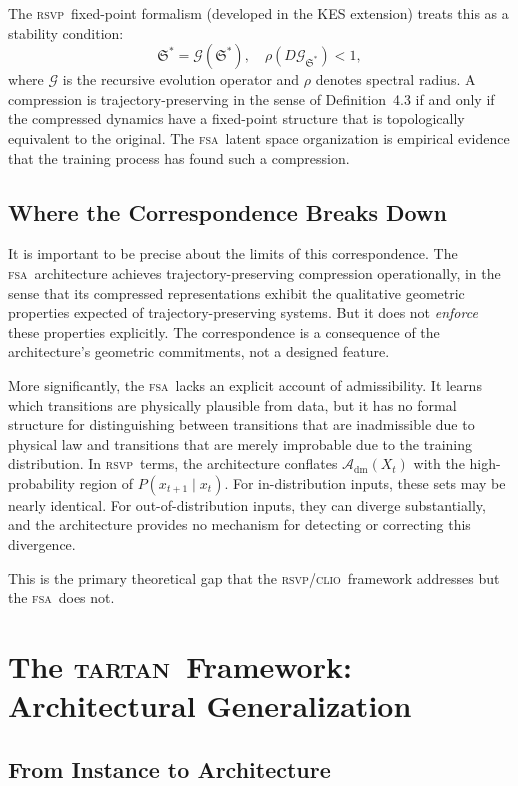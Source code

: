 \documentclass[11pt,a4paper]{article}
\theoremstyle{plain}
\theoremstyle{definition}
\theoremstyle{remark}
\newcommand{\Adm}{\mathcal{A}_{\mathrm{dm}}}
\newcommand{\KES}{\mathfrak{S}}
\newcommand{\RSVP}{\textup{\textsc{rsvp}}}
\newcommand{\CLIO}{\textup{\textsc{clio}}}
\newcommand{\TARTAN}{\textup{\textsc{tartan}}}
\newcommand{\FSA}{\textup{\textsc{fsa}}}
\begin{document}
The \RSVP\ fixed-point formalism (developed in the KES extension) treats
this as a stability condition:
\[
\KES^* = \mathcal{G}(\KES^*),
\quad \rho(D\mathcal{G}_{\KES^*}) < 1,
\]
where $\mathcal{G}$ is the recursive evolution operator and $\rho$ denotes
spectral radius. A compression is trajectory-preserving in the sense of
Definition~4.3 if and only if the compressed dynamics have a fixed-point
structure that is topologically equivalent to the original. The \FSA\
latent space organization is empirical evidence that the training process
has found such a compression.

\subsection{Where the Correspondence Breaks Down}

It is important to be precise about the limits of this correspondence.
The \FSA\ architecture achieves trajectory-preserving compression
operationally, in the sense that its compressed representations exhibit
the qualitative geometric properties expected of trajectory-preserving
systems. But it does not \textit{enforce} these properties explicitly. The
correspondence is a consequence of the architecture's geometric
commitments, not a designed feature.

More significantly, the \FSA\ lacks an explicit account of admissibility.
It learns which transitions are physically plausible from data, but it has
no formal structure for distinguishing between transitions that are
inadmissible due to physical law and transitions that are merely improbable
due to the training distribution. In \RSVP\ terms, the architecture
conflates $\Adm(X_t)$ with the high-probability region of $P(x_{t+1} \mid
x_t)$. For in-distribution inputs, these sets may be nearly identical.
For out-of-distribution inputs, they can diverge substantially, and the
architecture provides no mechanism for detecting or correcting this
divergence.

This is the primary theoretical gap that the \RSVP/\CLIO\ framework
addresses but the \FSA\ does not.

\section{The \TARTAN\ Framework: Architectural Generalization}
\label{sec:tartan}

\subsection{From Instance to Architecture}
\end{document}
